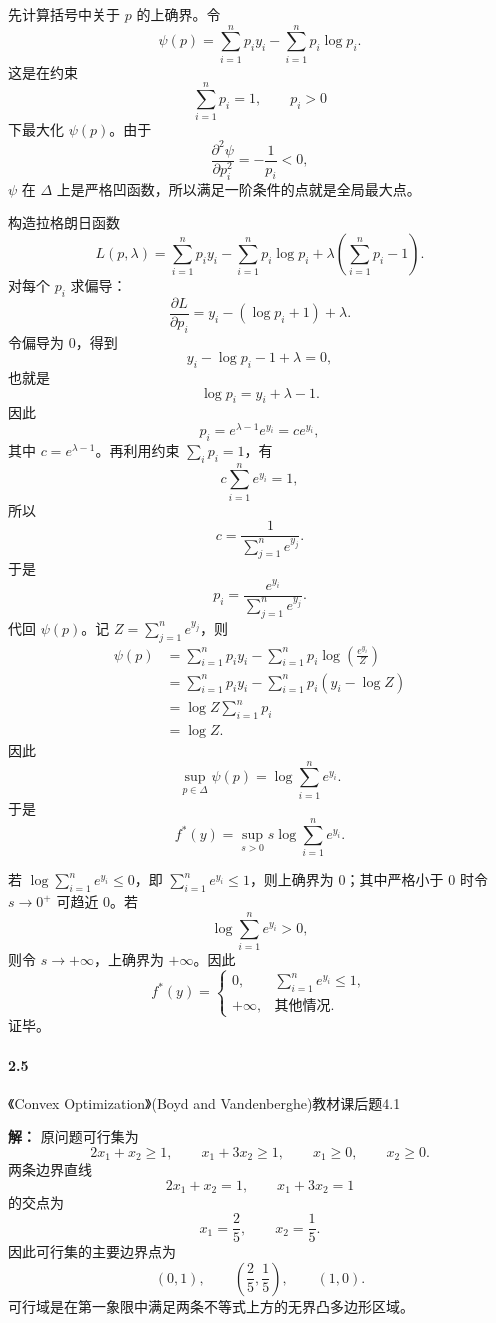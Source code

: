 \documentclass[12pt,a4paper]{article}
\begin{document}
先计算括号中关于 $p$ 的上确界。令
\[
  \psi(p)=\sum_{i=1}^n p_i y_i-\sum_{i=1}^n p_i\log p_i.
\]
这是在约束
\[
  \sum_{i=1}^n p_i=1,\qquad p_i>0
\]
下最大化 $\psi(p)$。由于
\[
  \frac{\partial^2 \psi}{\partial p_i^2}=-\frac{1}{p_i}<0,
\]
$\psi$ 在 $\Delta$ 上是严格凹函数，所以满足一阶条件的点就是全局最大点。

构造拉格朗日函数
\[
  L(p,\lambda)
  =\sum_{i=1}^n p_i y_i-\sum_{i=1}^n p_i\log p_i
  +\lambda\left(\sum_{i=1}^n p_i-1\right).
\]
对每个 $p_i$ 求偏导：
\[
  \frac{\partial L}{\partial p_i}
  =y_i-(\log p_i+1)+\lambda.
\]
令偏导为 $0$，得到
\[
  y_i-\log p_i-1+\lambda=0,
\]
也就是
\[
  \log p_i=y_i+\lambda-1.
\]
因此
\[
  p_i=e^{\lambda-1}e^{y_i}=ce^{y_i},
\]
其中 $c=e^{\lambda-1}$。再利用约束 $\sum_i p_i=1$，有
\[
  c\sum_{i=1}^n e^{y_i}=1,
\]
所以
\[
  c=\frac{1}{\sum_{j=1}^n e^{y_j}}.
\]
于是
\[
  p_i=\frac{e^{y_i}}{\sum_{j=1}^n e^{y_j}}.
\]
代回 $\psi(p)$。记 $Z=\sum_{j=1}^n e^{y_j}$，则
\[
\begin{aligned}
  \psi(p)
  &=\sum_{i=1}^n p_i y_i
    -\sum_{i=1}^n p_i\log\left(\frac{e^{y_i}}{Z}\right)\\
  &=\sum_{i=1}^n p_i y_i
    -\sum_{i=1}^n p_i(y_i-\log Z)\\
  &=\log Z\sum_{i=1}^n p_i\\
  &=\log Z.
\end{aligned}
\]
因此
\[
  \sup_{p\in\Delta}\psi(p)=\log\sum_{i=1}^n e^{y_i}.
\]
于是
\[
  f^*(y)=\sup_{s>0}s\log\sum_{i=1}^n e^{y_i}.
\]

若 $\log\sum_{i=1}^n e^{y_i}\leq 0$，即 $\sum_{i=1}^n e^{y_i}\leq 1$，则上确界为 $0$；其中严格小于 $0$ 时令 $s\to 0^+$ 可趋近 $0$。若
\[
  \log\sum_{i=1}^n e^{y_i}>0,
\]
则令 $s\to+\infty$，上确界为 $+\infty$。因此
\[
  f^*(y)=
  \begin{cases}
    0, & \sum_{i=1}^n e^{y_i}\leq 1,\\
    +\infty, & \text{其他情况}.
  \end{cases}
\]
证毕。




\paragraph{2.5} 《Convex Optimization》(Boyd and Vandenberghe)教材课后题4.1

\textbf{解：}
原问题可行集为
\[
  2x_1+x_2\geq 1,\qquad
  x_1+3x_2\geq 1,\qquad
  x_1\geq 0,\qquad x_2\geq 0.
\]
两条边界直线
\[
  2x_1+x_2=1,\qquad x_1+3x_2=1
\]
的交点为
\[
  x_1=\frac25,\qquad x_2=\frac15.
\]
因此可行集的主要边界点为
\[
  (0,1),\qquad \left(\frac25,\frac15\right),\qquad (1,0).
\]
可行域是在第一象限中满足两条不等式上方的无界凸多边形区域。
\end{document}
